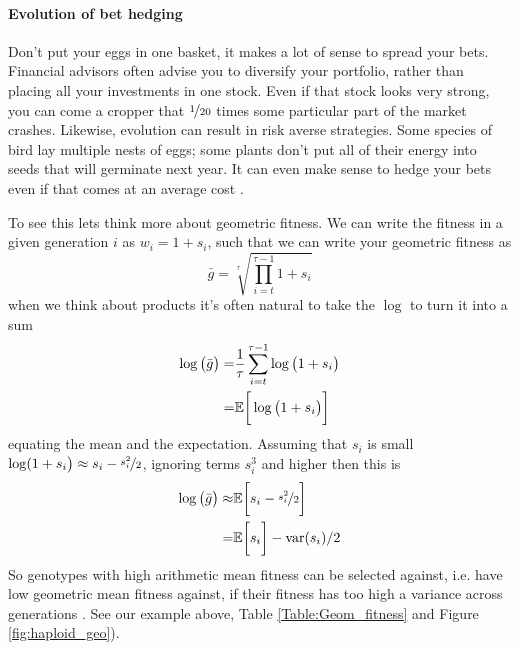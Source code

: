 \paragraph{Evolution of bet hedging}


Don't put your eggs in one basket, it makes a lot of sense to spread
your bets. Financial advisors often advise you to diversify your
portfolio, rather than placing all your investments in one stock. Even
if that stock looks very strong, you can come a cropper that
$\nicefrac{1}{20}$ times some particular part of the market
crashes. Likewise, evolution can result in risk averse
strategies. Some species of bird lay multiple nests of eggs; some
plants don't put all of their energy into seeds that will germinate next year. It can
even make sense to hedge your bets even if that comes at an average
cost \citep{seger1987oxford}.

To see this lets think more about geometric fitness. We can write the
fitness in a given generation $i$ as $w_{i}= 1+s_i$, such that we can
write your geometric fitness as
\begin{equation}
 \bar{g}= \sqrt[\tau]{\prod_{i=t}^{\tau-1} 1+s_i}  \label{hap_geo_fitness}
  \end{equation}
when we think about products it's often natural to take the $\log$ to
turn it into a sum
\begin{align}
 \log \big( \bar{g} \big) =& \frac{1}{\tau} \sum_{i=t}^{\tau-1} \log \big(1+s_i \big) \nonumber\\
  = & \mathbb{E} \bigg[ \log \big( 1+s_i \big) \bigg]
\end{align}
equating the mean and the expectation. Assuming that $s_i$ is small $\log(1+s_i \big) \approx s_i -
\nicefrac{s_i^2}{2}$, ignoring terms $s_i^3$ and higher then this is
\begin{align}
  \log \big( \bar{g}  \big) \approx & \mathbb{E}\bigg[  s_i -\nicefrac{s_i^2}{2}  \bigg]  \nonumber\\
  =  & \mathbb{E} \bigg[  s_i \bigg]  - \textrm{var}(s_i)/2 \nonumber\\
\end{align}
So genotypes with high arithmetic mean fitness can be selected against,
i.e. have low geometric mean fitness against, if their fitness has too
high a variance across generations \citep{gillespie1973natural,gillespie1977natural}. See our example
above,  Table \ref{Table:Geom_fitness} and Figure \ref{fig:haploid_geo}).

